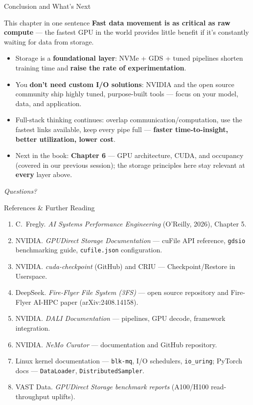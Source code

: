 \documentclass[aspectratio=169]{beamer}
\newcommand{\kw}[1]{\textbf{\textcolor{kwblue}{#1}}}
\begin{document}
\begin{frame}{Conclusion and What's Next}
  \begin{block}{This chapter in one sentence}
    \kw{Fast data movement is as critical as raw compute} --- the fastest GPU in the world
    provides little benefit if it's constantly waiting for data from storage.
  \end{block}
  \begin{itemize}
    \item Storage is a \kw{foundational layer}: NVMe + GDS + tuned pipelines shorten
          training time and \kw{raise the rate of experimentation}.
    \item You \kw{don't need custom I/O solutions}: NVIDIA and the open source community ship
          highly tuned, purpose-built tools --- focus on your model, data, and application.
    \item Full-stack thinking continues: overlap communication/computation, use the fastest
          links available, keep every pipe full --- \kw{faster time-to-insight, better
          utilization, lower cost}.
    \item Next in the book: \kw{Chapter 6} --- GPU architecture, CUDA, and occupancy
          (covered in our previous session); the storage principles here stay relevant at
          \kw{every} layer above.
  \end{itemize}
  \medskip
  \centering\itshape Questions?
\end{frame}

\begin{frame}{References \& Further Reading}
  \begingroup\footnotesize
  \begin{enumerate}
    \item C.\ Fregly. \emph{AI Systems Performance Engineering} (O'Reilly, 2026), Chapter 5.
    \item NVIDIA. \emph{GPUDirect Storage Documentation} --- cuFile API reference,
          \texttt{gdsio} benchmarking guide, \texttt{cufile.json} configuration.
    \item NVIDIA. \emph{cuda-checkpoint} (GitHub) and CRIU --- Checkpoint/Restore in Userspace.
    \item DeepSeek. \emph{Fire-Flyer File System (3FS)} --- open source repository and
          Fire-Flyer AI-HPC paper (arXiv:2408.14158).
    \item NVIDIA. \emph{DALI Documentation} --- pipelines, GPU decode, framework integration.
    \item NVIDIA. \emph{NeMo Curator} --- documentation and GitHub repository.
    \item Linux kernel documentation --- \texttt{blk-mq}, I/O schedulers, \texttt{io\_uring};
          PyTorch docs --- \texttt{DataLoader}, \texttt{DistributedSampler}.
    \item VAST Data. \emph{GPUDirect Storage benchmark reports} (A100/H100 read-throughput uplifts).
  \end{enumerate}\endgroup
\end{frame}
\end{document}
